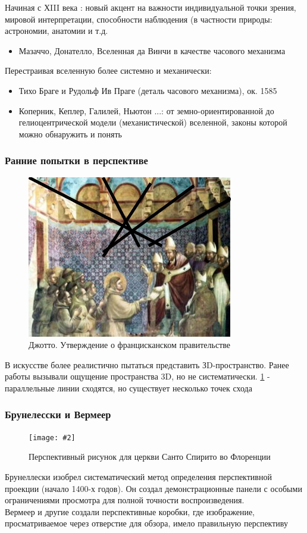 \documentclass[a4paper, 14pt]{extarticle}
\newcommand{\screenshot}[3]{
	\begin{figure}[h]
		\centering
		\texttt{[image: \#2]}
		\caption{#3}
	\end{figure}
}
\begin{document}
Начиная с ХIII века : новый акцент на важности индивидуальной точки зрения, мировой интерпретации, способности наблюдения (в частности природы: астрономии, анатомии и т.д.
\begin{itemize}
	\item Мазаччо, Донателло, Вселенная да Винчи в качестве часового механизма
\end{itemize}
Перестраивая вселенную более системно и механически:
\begin{itemize}
	\item Тихо Браге и Рудольф Ив Праге (деталь часового механизма), ок. 1585
	\item Коперник, Кеплер, Галилей, Ньютон ...: от земно-ориентированной до гелиоцентрической модели 	(механистической) вселенной, законы которой можно обнаружить и понять
\end{itemize}

\FloatBarrier
\subsubsection{Ранние попытки в перспективе}
\begin{figure}[h]
	\centering
	\includegraphics[width=9cm]{l5/S006.jpg}
	\caption{Джотто. Утверждение о францисканском правительстве}
	\label{renproj1}
\end{figure}
В искусстве более реалистично пытаться представить ЗD-пространство. Ранее работы вызывали ощущение пространства 3D, но не систематически. \ref{renproj1} - параллельные линии сходятся, но существует несколько точек схода

\subsubsection{Брунелесски и Вермеер}
\screenshot{width=9cm}{l5/S007.jpg}{Перспективный рисунок для церкви Санто Спирито во Флоренции}
Брунеллески изобрел систематический метод определения перспективной проекции (начало 1400-х годов). Он создал демонстрационные панели с особыми ограничениями просмотра для полной точности воспроизведения. \\
Вермеер и другие создали перспективные коробки, где изображение, просматриваемое через отверстие для обзора, имело правильную перспективу
\end{document}
